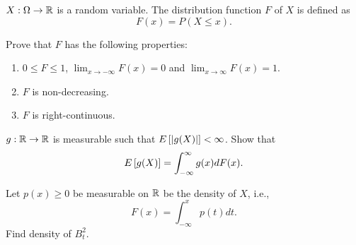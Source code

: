 \begin{exercise}{2.2}\label{ex:2.2}
    $X:\Omega\to\mathbb{R}$ is a random variable. The distribution function $F$ of $X$ is 
    defined as 
    \begin{equation*}
        F(x) = P(X\leq x). 
    \end{equation*}
    \begin{thmenum}
        \item Prove that $F$ has the following properties:
        \begin{enumerate}[label=(\roman*)]
            \item $0\leq F\leq 1$, $\lim_{x\to-\infty} F(x) = 0$ and $\lim_{x\to\infty} F(x) = 1$.
            \item $F$ is non-decreasing. 
            \item $F$ is right-continuous. 
        \end{enumerate}
        \item $g:\mathbb{R}\to\mathbb{R}$ is measurable such that $E\left[ {\left\lvert {g(X)} \right\rvert} \right] < \infty$. Show 
        that 
        \begin{equation*}
            E\left[ {g(X)} \right] = \int_{-\infty}^\infty g(x) dF(x).
        \end{equation*}
        \item Let $p(x)\geq 0$ be measurable on $\mathbb{R}$ be the density of $X$, i.e., 
        \begin{equation*}
            F(x) = \int_{-\infty}^x p(t) dt.
        \end{equation*}
        Find density of $B_t^2$. 
    \end{thmenum}
\end{exercise}
